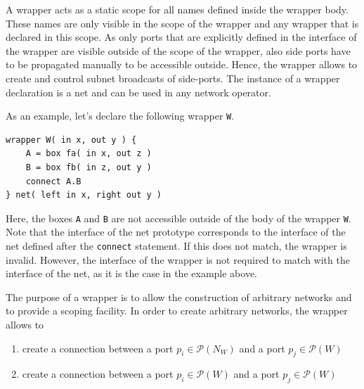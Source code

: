 A wrapper acts as a static scope for all names defined inside the wrapper body.
These names are only visible in the scope of the wrapper and any wrapper that is declared in this scope.
As only ports that are explicitly defined in the interface of the wrapper are visible outside of the scope of the wrapper, also side ports have to be propagated manually to be accessible outside.
Hence, the wrapper allows to create and control subnet broadcasts of side-ports.
The instance of a wrapper declaration is a net and can be used in any network operator.

As an example, let's declare the following wrapper \texttt{W}.
\begin{lstlisting}[numbers=none]
wrapper W( in x, out y ) {
    A = box fa( in x, out z )
    B = box fb( in z, out y )
    connect A.B
} net( left in x, right out y )
\end{lstlisting}
Here, the boxes \texttt{A} and \texttt{B} are not accessible outside of the body of the wrapper \texttt{W}.
Note that the interface of the net prototype corresponds to the interface of the net defined after the \texttt{connect} statement.
If this does not match, the wrapper is invalid.
However, the interface of the wrapper is not required to match with the interface of the net, as it is the case in the example above.

The purpose of a wrapper is to allow the construction of arbitrary networks and to provide a scoping facility.
In order to create arbitrary networks, the wrapper allows to
\begin{enumerate}
    \item create a connection between a port $p_i \in \mathcal{P}(N_W)$ and a port $p_j \in \mathcal{P}(W)$
    \item create a connection between a port $p_i \in \mathcal{P}(W)$ and a port $p_j \in \mathcal{P}(W)$
\end{enumerate}

